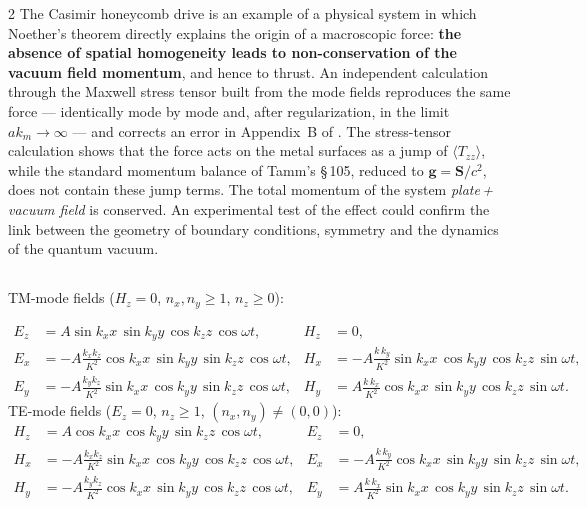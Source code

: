 \documentclass[twoside, 10pt]{article}
\def\myvspacebeforesubsection{-2.0mm}
\def\myvspaceaftersubsection{-2.5mm}
\begin{document}
\begin{multicols}{2}
The Casimir honeycomb drive is an example of a physical system in which Noether's theorem directly
explains the origin of a macroscopic force: \textbf{the absence of spatial homogeneity leads to
non-conservation of the vacuum field momentum}, and hence to thrust. An independent calculation through the
Maxwell stress tensor built from the mode fields reproduces the same force --- identically mode by
mode and, after regularization, in the limit \(ak_m\to\infty\) --- and corrects an error in
Appendix~B of \cite{Drozdov2024}. The stress-tensor calculation shows that the force acts on the
metal surfaces as a jump of \(\langle T_{zz}\rangle\), while the standard momentum balance of Tamm's
\S\,105, reduced to \(\mathbf g=\mathbf S/c^2\), does not contain these jump terms. The total
momentum of the system \emph{plate\,+\,vacuum field} is conserved. An experimental test of the
effect could confirm the link between the geometry of boundary conditions, symmetry and the dynamics
of the quantum vacuum.

\vspace{\myvspacebeforesubsection}
\subsection*{}
\vspace{\myvspaceaftersubsection}


TM-mode fields (\(H_z=0\), \(n_x,n_y\ge1\), \(n_z\ge0\)):
\end{multicols}
\[
\begin{aligned}
E_z&=A\sin k_xx\,\sin k_yy\,\cos k_zz\,\cos\omega t, &
H_z&=0,\\
E_x&=-A\frac{k_xk_z}{K^2}\cos k_xx\,\sin k_yy\,\sin k_zz\,\cos\omega t, &
H_x&=-A\frac{k\,k_y}{K^2}\sin k_xx\,\cos k_yy\,\cos k_zz\,\sin\omega t,\\
E_y&=-A\frac{k_yk_z}{K^2}\sin k_xx\,\cos k_yy\,\sin k_zz\,\cos\omega t, &
H_y&=A\frac{k\,k_x}{K^2}\cos k_xx\,\sin k_yy\,\cos k_zz\,\sin\omega t.
\end{aligned}
\]
TE-mode fields (\(E_z=0\), \(n_z\ge1\), \((n_x,n_y)\ne(0,0)\)):
\[
\begin{aligned}
H_z&=A\cos k_xx\,\cos k_yy\,\sin k_zz\,\cos\omega t, &
E_z&=0,\\
H_x&=-A\frac{k_xk_z}{K^2}\sin k_xx\,\cos k_yy\,\cos k_zz\,\cos\omega t, &
E_x&=-A\frac{k\,k_y}{K^2}\cos k_xx\,\sin k_yy\,\sin k_zz\,\sin\omega t,\\
H_y&=-A\frac{k_yk_z}{K^2}\cos k_xx\,\sin k_yy\,\cos k_zz\,\cos\omega t, &
E_y&=A\frac{k\,k_x}{K^2}\sin k_xx\,\cos k_yy\,\sin k_zz\,\sin\omega t.
\end{aligned}
\]
\end{document}
